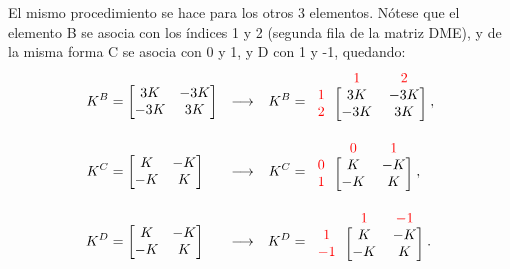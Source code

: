El mismo procedimiento se hace para los otros 3 elementos. Nótese que el 
elemento B se asocia con los índices 1 y 2 (segunda fila de la matriz DME), y 
de la misma forma C se asocia con 0 y 1, y D con 1 y -1, quedando:
\begin{align*}
K^B &= \begin{bmatrix}
3K &-3K\\
-3K &3K\\
\end{bmatrix}
&\longrightarrow&
&K^B &=
\begin{blockarray}{ccc}
&\color{red}{1} &\color{red}{2}\\
\begin{block}{c[cc]}
\color{red}{1} &3K &-3K\\
\color{red}{2} &-3K &3K\\
\end{block}
\end{blockarray}\, ,\\
K^C &= \begin{bmatrix}
K &-K\\
-K &K\\
\end{bmatrix}
&\longrightarrow&
&K^C &=
\begin{blockarray}{ccc}
&\color{red}{0} &\color{red}{1}\\
\begin{block}{c[cc]}
\color{red}{0} &K &-K\\
\color{red}{1} &-K &K\\
\end{block}
\end{blockarray}\, ,\\
K^D &= \begin{bmatrix}
K &-K\\
-K &K\\
\end{bmatrix}
&\longrightarrow&
&K^D &=
\begin{blockarray}{ccc}
&\color{red}{1} &\color{red}{-1}\\
\begin{block}{c[cc]}
\color{red}{1} &K &-K\\
\color{red}{-1} &-K &K\\
\end{block}
\end{blockarray}\, .
\end{align*}

